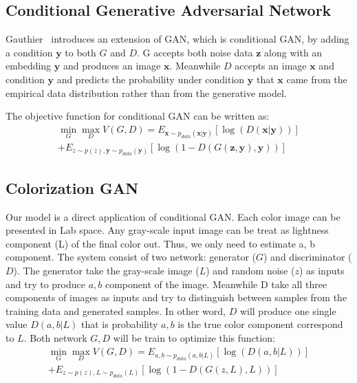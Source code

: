 \documentclass[10pt,twocolumn,letterpaper]{article}
\begin{document}
\subsection{Conditional Generative Adversarial Network} 
Gauthier~\cite{gauthier2014conditional} introduces an extension of GAN, which is conditional GAN, by adding a condition $\mathbf{y}$ to both $G$ and $D$. G accepts both noise data $\mathbf{z}$ along with an embedding $\mathbf{y}$ and produces an image $\mathbf{x}$. Meanwhile $D$ accepts an image $\mathbf{x}$ and condition $\mathbf{y}$ and predicts the probability under condition $\mathbf{y}$ that $\mathbf{x}$ came from the empirical data distribution rather than from the generative model.

The objective function for conditional GAN can be written as:
\begin{align}
 \min_{G} \max_{D} V(G,D) = E_{\mathbf{x} \sim p_{data}(\mathbf{x} | \mathbf{y})} [\log(D(\mathbf{x}|\mathbf{y}))] \nonumber \\
+  E_{z \sim p(z), \mathbf{y} \sim p_{data}(\mathbf{y}) } [\log(1-D(G(\mathbf{z,y}),\mathbf{y}))]
\end{align}

\subsection{Colorization GAN}

Our model is a direct application of conditional GAN. Each color image can be presented in Lab space. Any gray-scale input image can be treat as lightness component (L) of the final color out. Thus, we only need to estimate a, b component. The system consist of two network: generator ($G$) and discriminator ($D$). The generator take the gray-scale image ($L$) and random noise ($z$) as inputs and try to produce $a, b$ component of the image. Meanwhile D take all three components of images as inputs and try to distinguish between samples from the training data and generated samples. In other word, $D$ will produce one single value $D(a,b|L)$ that is probability $a, b$ is the true color component correspond to $L$. Both network $G, D$ will be train to optimize this function:
\begin{align}
 \min_{G} \max_{D} V(G,D) =  E_{a, b \sim p_{data}(a,b | L)} [\log(D(a,b|L))] \nonumber \\
                          + E_{z \sim p(z), L \sim p_{data}(L) } [\log(1-D(G(z,L),L))]
\end{align}
\end{document}
